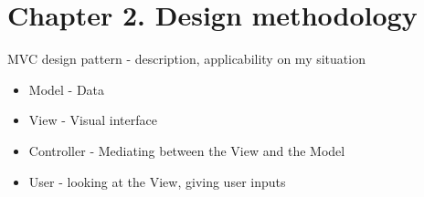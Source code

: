 \chapter{Chapter 2. Design methodology}
MVC design pattern - description, applicability on my situation
\begin{itemize}
\item Model - Data
\item View - Visual interface
\item Controller - Mediating between the View and the Model
\item User - looking at the View, giving user inputs
\end{itemize}

    
    
    
    
  